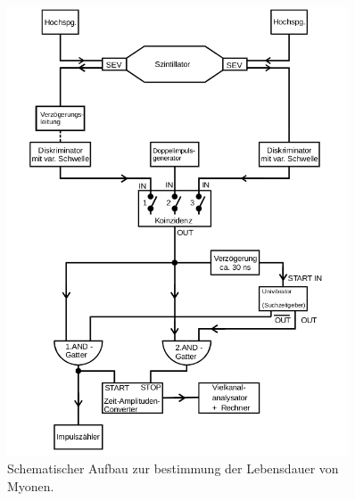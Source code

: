 \begin{figure}
    \centering
    \includegraphics[width=0.9\textwidth]{bilder/aufbau.png}
    \caption{Schematischer Aufbau zur bestimmung der Lebensdauer von Myonen. \cite{skript}} 
    \label{fig:1}
\end{figure}